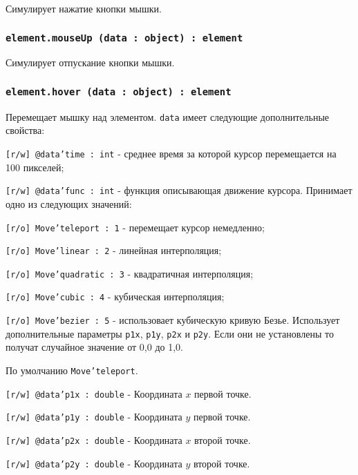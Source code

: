 Симулирует нажатие кнопки мышки.

\subsubsection{\texttt{element.mouseUp (data : object) : element}}

Симулирует отпускание кнопки мышки.

\subsubsection{\texttt{element.hover (data : object) : element}}

Перемещает мышку над элементом. \texttt{data} имеет следующие дополнительные свойства:
\begin{icItems}
	\item \texttt{[r/w] @data'time : int} - среднее время за которой курсор перемещается на 100 пикселей;
	\item \texttt{[r/w] @data'func : int} - функция описывающая движение курсора. Принимает одно из следующих значений:
	\begin{icItems}
		\item \texttt{[r/o] Move'teleport : 1} - перемещает курсор немедленно;
		\item \texttt{[r/o] Move'linear : 2} - линейная интерполяция;
		\item \texttt{[r/o] Move'quadratic : 3} - квадратичная интерполяция;
		\item \texttt{[r/o] Move'cubic : 4} - кубическая интерполяция;
		\item \texttt{[r/o] Move'bezier : 5} - использовает кубическую кривую Безье. Использует дополнительные параметры \texttt{p1x}, \texttt{p1y}, \texttt{p2x} и \texttt{p2y}. Если они не установлены то получат случайное значение от 0,0 до 1,0.
	\end{icItems}
	По умолчанию \texttt{Move'teleport}.
	\item \texttt{[r/w] @data'p1x : double} - Координата $x$ первой точке.
	\item \texttt{[r/w] @data'p1y : double} - Координата $y$ первой точке.
	\item \texttt{[r/w] @data'p2x : double} - Координата $x$ второй точке.
	\item \texttt{[r/w] @data'p2y : double} - Координата $y$ второй точке.
\end{icItems}

